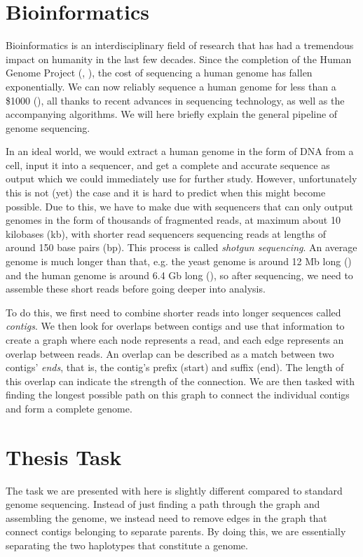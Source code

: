\documentclass[times, utf8, diplomski, english]{fer_eng}
\begin{document}
\section{Bioinformatics}

Bioinformatics is an interdisciplinary field of research that has had a tremendous impact on humanity in the last few decades. Since the completion of the Human Genome Project (\cite{HGP1}, \cite{HGP2}), the cost of sequencing a human genome has fallen exponentially. We can now reliably sequence a human genome for less than a \$1000 (\cite{genome_cost}), all thanks to recent advances in sequencing technology, as well as the accompanying algorithms. We will here briefly explain the general pipeline of genome sequencing.

In an ideal world, we would extract a human genome in the form of DNA from a cell, input it into a sequencer, and get a complete and accurate sequence as output which we could immediately use for further study. However, unfortunately this is not (yet) the case and it is hard to predict when this might become possible. Due to this, we have to make due with sequencers that can only output genomes in the form of thousands of fragmented reads, at maximum about 10 kilobases (kb), with shorter read sequencers sequencing reads at lengths of around 150 base pairs (bp). This process is called \textit{shotgun sequencing}. An average genome is much longer than that, e.g. the yeast genome is around 12 Mb long (\cite{yeast}) and the human genome is around 6.4 Gb long (\cite{human}), so after sequencing, we need to assemble these short reads before going deeper into analysis.

To do this, we first need to combine shorter reads into longer sequences called \textit{contigs}. We then look for overlaps between contigs and use that information to create a graph where each node represents a read, and each edge represents an overlap between reads. An overlap can be described as a match between two contigs' \textit{ends}, that is, the contig's prefix (start) and suffix (end). The length of this overlap can indicate the strength of the connection. We are then tasked with finding the longest possible path on this graph to connect the individual contigs and form a complete genome.

\section{Thesis Task}

The task we are presented with here is slightly different compared to standard genome sequencing. Instead of just finding a path through the graph and assembling the genome, we instead need to remove edges in the graph that connect contigs belonging to separate parents. By doing this, we are essentially separating the two haplotypes that constitute a genome.
\end{document}
